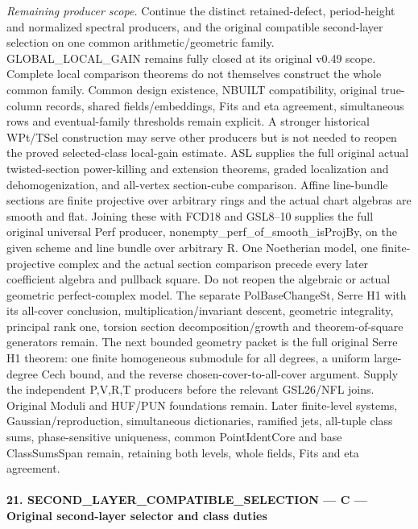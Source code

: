 \documentclass[11pt,a4paper]{article}
\numberwithin{equation}{section}
\theoremstyle{remark}\newtheorem{remark}[theorem]{Remark}
\begin{document}
\emph{Remaining producer scope.} Continue the distinct retained-defect, period-height and normalized spectral producers, and the original compatible second-layer selection on one common arithmetic/geometric family. GLOBAL\_\allowbreak LOCAL\_\allowbreak GAIN remains fully closed at its original v0.49 scope. Complete local comparison theorems do not themselves construct the whole common family. Common design existence, NBUILT compatibility, original true-column records, shared fields/embeddings, Fits and eta agreement, simultaneous rows and eventual-family thresholds remain explicit. A stronger historical WPt/TSel construction may serve other producers but is not needed to reopen the proved selected-class local-gain estimate. ASL supplies the full original actual twisted-section power-killing and extension theorems, graded localization and dehomogenization, and all-vertex section-cube comparison. Affine line-bundle sections are finite projective over arbitrary rings and the actual chart algebras are smooth and flat. Joining these with FCD18 and GSL8–10 supplies the full original universal Perf producer, nonempty\_\allowbreak perf\_\allowbreak of\_\allowbreak smooth\_\allowbreak isProjBy, on the given scheme and line bundle over arbitrary R. One Noetherian model, one finite-projective complex and the actual section comparison precede every later coefficient algebra and pullback square. Do not reopen the algebraic or actual geometric perfect-complex model. The separate PolBaseChangeSt, Serre H1 with its all-cover conclusion, multiplication/invariant descent, geometric integrality, principal rank one, torsion section decomposition/growth and theorem-of-square generators remain. The next bounded geometry packet is the full original Serre H1 theorem: one finite homogeneous submodule for all degrees, a uniform large-degree Cech bound, and the reverse chosen-cover-to-all-cover argument. Supply the independent P,V,R,T producers before the relevant GSL26/NFL joins. Original Moduli and HUF/PUN foundations remain. Later finite-level systems, Gaussian/reproduction, simultaneous dictionaries, ramified jets, all-tuple class sums, phase-sensitive uniqueness, common PointIdentCore and base ClassSumsSpan remain, retaining both levels, whole fields, Fits and eta agreement.



\paragraph{21. SECOND\_\allowbreak LAYER\_\allowbreak COMPATIBLE\_\allowbreak SELECTION — C — Original second-layer selector and class duties}
\end{document}

